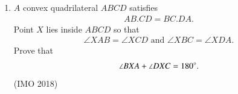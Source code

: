 \begin{enumerate}[label=\thesubsection.\arabic*,ref=\thesubsection.\theenumi]
\item $A$ convex quadrilateral $ABCD$ satisfies \begin{align*}AB.CD=BC.DA.\end{align*} Point $X$ lies inside $ABCD$ so that \begin{align*}\angle XAB=\angle XCD \text{ and } \angle XBC=\angle XDA.    \end{align*} Prove that\begin{align*}\angle BXA+\angle DXC=180\degree.\end{align*}\hfill (IMO  2018)
		

\end{enumerate}
